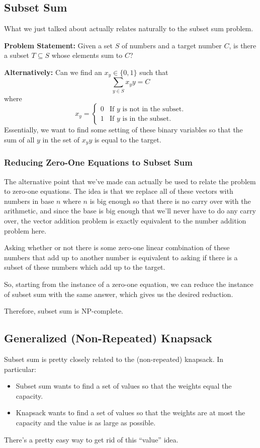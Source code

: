 \documentclass[letterpaper]{article}
\begin{document}
\subsection{Subset Sum}
What we just talked about actually relates naturally to the subset sum problem. 

\bigskip 

\textbf{Problem Statement:} Given a set $S$ of numbers and a target number $C$, is there a subset $T \subseteq S$ whose elements sum to $C$? 

\bigskip 

\textbf{Alternatively:} Can we find an $x_y \in \{0, 1\}$ such that 
\[\sum_{y \in S} x_y y = C\]
where
\[x_y = \begin{cases}
    0 & \text{If } y \text{ is not in the subset.} \\ 
    1 & \text{If } y \text{ is in the subset.} 
\end{cases}\]
Essentially, we want to find some setting of these binary variables so that the sum of all $y$ in the set of $x_y y$ is equal to the target. 

\subsubsection{Reducing Zero-One Equations to Subset Sum}
The alternative point that we've made can actually be used to relate the problem to zero-one equations. The idea is that we replace all of these vectors with numbers in base $n$ where $n$ is big enough so that there is no carry over with the arithmetic, and since the base is big enough that we'll never have to do any carry over, the vector addition problem is exactly equivalent to the number addition problem here. 

\bigskip 

Asking whether or not there is some zero-one linear combination of these numbers that add up to another number is equivalent to asking if there is a subset of these numbers which add up to the target. 

\bigskip 

So, starting from the instance of a zero-one equation, we can reduce the instance of subset sum with the same answer, which gives us the desired reduction. 

\bigskip 

Therefore, subset sum is NP-complete. 

\subsection{Generalized (Non-Repeated) Knapsack}
Subset sum is pretty closely related to the (non-repeated) knapsack. In particular: 
\begin{itemize}
    \item Subset sum wants to find a set of values so that the weights equal the capacity. 
    \item Knapsack wants to find a set of values so that the weights are at most the capacity and the value is as large as possible. 
\end{itemize}
There's a pretty easy way to get rid of this ``value'' idea. 
\end{document}
